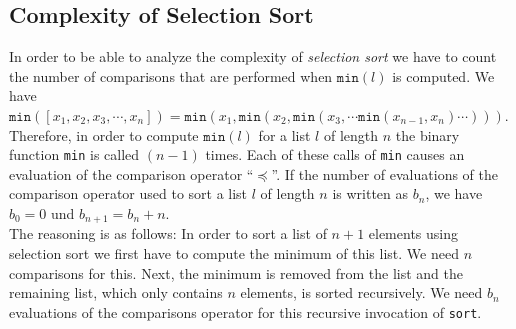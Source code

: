 \subsection{Complexity of Selection Sort}
In order to be able to analyze the complexity of \emph{selection sort} we have to count the number
of comparisons that are performed when $\mathtt{min}(l)$ is computed.  We have 
\\[0.2cm]
\hspace*{1.3cm} 
$\mathtt{min}([x_1,x_2,x_3,\cdots,x_n]) = \mathtt{min}(x_1, \mathtt{min}(x_2, \mathtt{min}(x_3, \cdots \mathtt{min}(x_{n-1},x_n) \cdots )))$. 
\\[0.2cm]
Therefore, in order to compute $\texttt{min}(l)$ for a list $l$ of length $n$ the binary function \texttt{min}
is called $(n-1)$ times.  Each of these calls of \texttt{min} causes an evaluation of the comparison
operator ``$\preceq$''.  If the number of evaluations of the comparison operator used to sort a list
$l$ of length $n$ is written as $b_n$, we have \\[0.2cm]
\hspace*{1.3cm}
$b_0 = 0$ \quad und \quad $b_{n+1} = b_n + n$. 
\\[0.2cm]
The reasoning is as follows: In order to sort a list of $n+1$ elements using selection sort we first
have to compute the minimum of this list.  We need $n$ comparisons for this.  Next, the minimum is
removed from the list and the remaining list, which only contains $n$ elements, is sorted
recursively.  We need $b_n$ evaluations of the comparisons operator for this recursive invocation of
\texttt{sort}.

